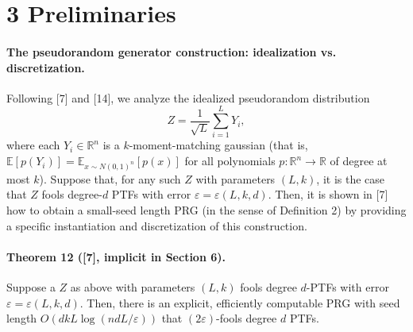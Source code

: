 \documentclass[10pt,a4paper]{article}
\begin{document}
\section*{3 Preliminaries}
\paragraph{The pseudorandom generator construction: idealization vs. discretization.} Following [7] and [14], we analyze the idealized pseudorandom distribution
\[Z=\frac1{\sqrt L}\sum_{i=1}^LY_i,\]
where each $Y_i\in\mathbb R^n$ is a $k$-moment-matching gaussian (that is, $\mathbb E[p(Y_i)]=\mathbb E_{x\sim N(0,1)^n}[p(x)]$ for all polynomials $p:\mathbb R^n\to\mathbb R$ of degree at most $k$).
Suppose that, for any such $Z$ with parameters $(L,k)$, it is the case that $Z$ fools degree-$d$ PTFs with error $\varepsilon=\varepsilon(L,k,d)$. Then, it is shown in [7] how to obtain a small-seed length PRG (in the sense of Definition 2) by providing a specific instantiation and discretization of this construction.
\paragraph{Theorem 12 ([7], implicit in Section 6).} Suppose a $Z$ as above with parameters $(L,k)$ fools degree $d$-PTFs with error $\varepsilon=\varepsilon(L,k,d)$. Then, there is an explicit, efficiently computable PRG with seed length $O(dkL\log(ndL/\varepsilon))$ that $(2\varepsilon)$-fools degree $d$ PTFs.
\end{document}
